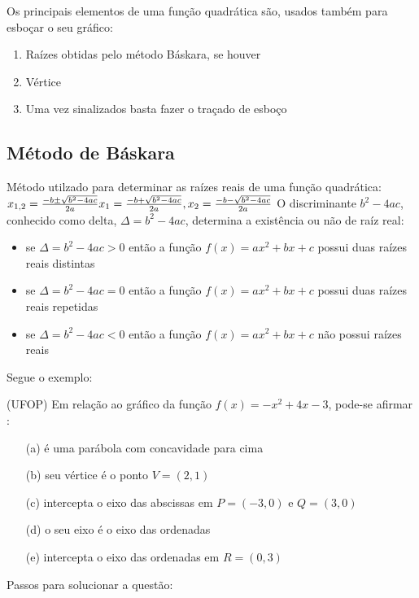 \begin{multicols*}{2}
\begin{itemize}
\begin{figure}[H]
            \end{figure}
            Os principais elementos de uma função quadrática são, usados também para esboçar o seu gráfico:
            \begin{enumerate}
            \item Raízes obtidas pelo método Báskara, se houver
            \item Vértice
            \item Uma vez sinalizados basta fazer o traçado de esboço
            \end{enumerate}
            \subsection*{Método de Báskara}
            Método utilzado para determinar as raízes reais de uma função quadrática:
            $
            x_{1,2} = \frac{- b \pm \sqrt{b^2 - 4ac} }{2a} \\
            x_1 = \frac{- b + \sqrt{b^2 - 4ac} }{2a} ,
            x_2 = \frac{- b - \sqrt{b^2 - 4ac} }{2a}
            $
            O discriminante $b^2 - 4ac$, conhecido como delta, $\Delta = b^2 - 4ac$, determina a existência 		ou não de raíz real:
            \begin{itemize}
            \item se $\Delta = b^2 - 4ac > 0 $ então a função $f(x) = ax^2 + bx + c$ possui duas raízes 			reais distintas
            \item se $\Delta = b^2 - 4ac = 0 $ então a função $f(x) = ax^2 + bx + c$ possui duas raízes 			reais repetidas
            \item se $\Delta = b^2 - 4ac < 0 $  então a função $f(x) = ax^2 + bx + c$ não possui raízes 			reais	
            \end{itemize}
            \end{itemize}
             Segue o exemplo:
             
             (UFOP) Em relação ao gráfico da função $f(x) = -x^2 + 4x -3$, pode-se afirmar :
             \begin{itemize}
             \item[(a)]é uma parábola com concavidade para cima
             \item[(b)]seu vértice é o ponto $V = (2,1)$
             \item[(c)] intercepta o eixo das abscissas em  $P = (-3,0)$ e $Q = (3,0)$
             \item[(d)]o seu eixo é o eixo das ordenadas 
             \item[(e)]intercepta o eixo das ordenadas em $R = (0,3)$
             \end{itemize}
             Passos para solucionar a questão:
             

\end{multicols*}

